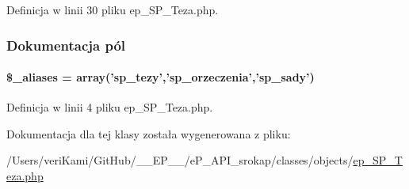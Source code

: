 Definicja w linii 30 pliku ep\-\_\-\-S\-P\-\_\-\-Teza.\-php.



\subsubsection{Dokumentacja pól}
\hypertarget{classep___s_p___teza_ab4e31d75f0bc5d512456911e5d01366b}{
\paragraph[{\$\-\_\-aliases}]{\setlength{\rightskip}{0pt plus 5cm}\$\-\_\-aliases = array('sp\-\_\-tezy','sp\-\_\-orzeczenia','sp\-\_\-sady')}}\label{classep___s_p___teza_ab4e31d75f0bc5d512456911e5d01366b}


Definicja w linii 4 pliku ep\-\_\-\-S\-P\-\_\-\-Teza.\-php.



Dokumentacja dla tej klasy została wygenerowana z pliku\-:\begin{DoxyCompactItemize}
\item 
/\-Users/veri\-Kami/\-Git\-Hub/\-\_\-\-\_\-\-E\-P\-\_\-\-\_\-/e\-P\-\_\-\-A\-P\-I\-\_\-srokap/classes/objects/\hyperlink{ep___s_p___teza_8php}{ep\-\_\-\-S\-P\-\_\-\-Teza.\-php}\end{DoxyCompactItemize}
